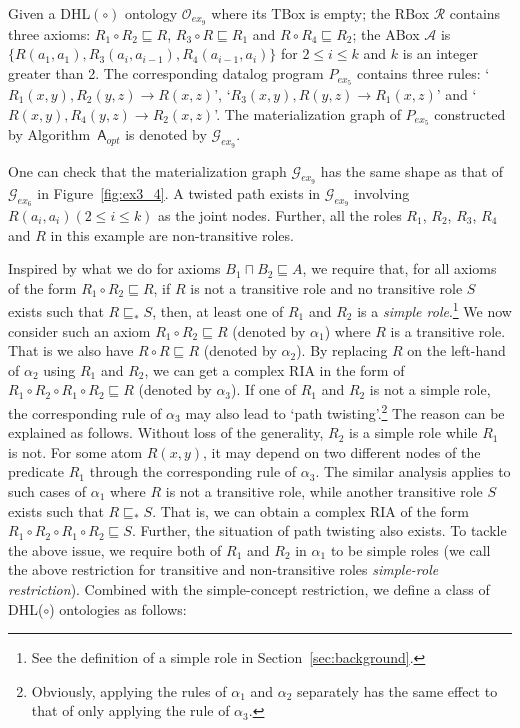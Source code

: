 \documentclass[final,1p,times]{elsarticle}
\begin{document}
\begin{example}\label{exp:complexRIA}
Given a DHL$(\circ)$ ontology $\mathcal{O}_{ex_9}$ where its TBox is empty;
the RBox $\mathcal{R}$ contains three axioms:
$R_1\circ R_2\sqsubseteq R$, $R_3\circ R\sqsubseteq R_1$ and $R\circ R_4\sqsubseteq R_2$;
the ABox $\mathcal{A}$ is $\{R(a_1,a_1), R_3(a_i,a_{i-1}), R_4(a_{i-1},a_i)\}$
for $2\leq i\leq k$ and $k$ is an integer greater than 2.
The corresponding datalog program $P_{ex_5}$
contains three rules: `$R_1(x,y),R_2(y,z)\rightarrow R(x,z)$',
`$R_3(x,y),R(y,z)\rightarrow R_1(x,z)$' and `$R(x,y),R_4(y,z)\rightarrow R_2(x,z)$'.
The materialization graph of $P_{ex_5}$ constructed by Algorithm~$\mathsf{A}_{opt}$ is denoted by $\mathcal{G}_{ex_9}$.
\end{example}

One can check that the materialization graph $\mathcal{G}_{ex_9}$ has the same shape as that
of $\mathcal{G}_{ex_6}$ in Figure~\ref{fig:ex3_4}.
A twisted path exists in $\mathcal{G}_{ex_9}$ involving $R(a_i,a_i) (2\leq i\leq k)$ as the joint nodes.
Further, all the roles $R_1$, $R_2$, $R_3$, $R_4$ and $R$ in this example are non-transitive roles.

Inspired by what we do for axioms $B_1\sqcap B_2\sqsubseteq A$,
we require that, for all axioms of the form $R_1\circ R_2\sqsubseteq R$,
if $R$ is not a transitive role and no transitive role $S$ exists such that $R\sqsubseteq_* S$,
then, at least one of $R_1$ and $R_2$ is
a \emph{simple role}.\footnote{See the definition of a simple role in Section~\ref{sec:background}.}
We now consider such an axiom $R_1\circ R_2\sqsubseteq R$ (denoted by $\alpha_1$) where $R$ is a transitive role.
That is we also have $R\circ R\sqsubseteq R$ (denoted by $\alpha_2$).
By replacing $R$ on the left-hand of $\alpha_2$ using $R_1$ and $R_2$,
we can get a complex RIA in the form of
$R_1\circ R_2\circ R_1\circ R_2\sqsubseteq R$ (denoted by $\alpha_3$).
If one of $R_1$ and $R_2$ is not a simple role, the corresponding
rule of $\alpha_3$ may also lead to `path twisting'.\footnote{Obviously, applying the rules of $\alpha_1$
and $\alpha_2$ separately has the same effect to that of only applying the rule of $\alpha_3$.}
The reason can be explained as follows.
Without loss of the generality,
$R_2$ is a simple role while $R_1$ is not.
For some atom $R(x,y)$, it may depend on two different nodes of the predicate $R_1$
through the corresponding rule of $\alpha_3$. The similar analysis applies to
such cases of $\alpha_1$ where $R$ is not a transitive role, while another transitive
role $S$ exists such that $R\sqsubseteq_* S$. That is, we can obtain
a complex RIA of the form $R_1\circ R_2\circ R_1\circ R_2\sqsubseteq S$.
Further, the situation of path twisting also exists.
To tackle the above issue,
we require both of $R_1$ and $R_2$ in $\alpha_1$ to be simple roles
(we call the above restriction for transitive and non-transitive roles \emph{simple-role restriction}).
Combined with the simple-concept restriction,
we define a class of DHL($\circ$) ontologies as follows:
\end{document}
